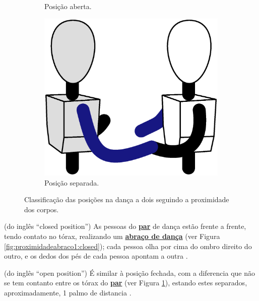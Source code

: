 \begin{figure}[!ht]
\begin{subfigure}[b]{0.31\textwidth}
         \caption{Posição aberta.}
         \label{fig:proximidadeabraco1:open}
     \end{subfigure}
     \hfill
     \begin{subfigure}[b]{0.31\textwidth}
         \centering
         \includegraphics[width=\textwidth]{chapters/cap-normas/position-apart.eps}
         \caption{Posição separada.}
         \label{fig:proximidadeabraco1:apart}
     \end{subfigure}
\caption{Classificação das posições na dança a dois seguindo a proximidade dos corpos.}
\label{fig:proximidadeabraco1}
\end{figure}


\begin{definition}
\label{def:closed-position}  (do inglês ``closed position'')
As pessoas do \hyperref[def:Par]{\textbf{par}} de dança estão frente a frente, tendo contato no tórax,
realizando um \hyperref[def:abracodedanca]{\textbf{abraço de dança}} (ver Figura \ref{fig:proximidadeabraco1:closed}); 
cada pessoa olha por cima do ombro direito do outro,
e os dedos dos pés de cada pessoa apontam a outra \cite{fletsher2015improve} \cite[pp. 6, 8]{harris1998social}.
\end{definition}


\begin{definition}
\label{def:open-position} (do inglês ``open position'') 
É similar à posição fechada, 
com a diferencia que não se tem contanto entre os tórax do \hyperref[def:Par]{\textbf{par}}
(ver Figura \ref{fig:proximidadeabraco1:open}),
estando estes separados, aproximadamente, 1 palmo de distancia \cite{fletsher2015improve} \cite[pp. 8]{harris1998social}.
\end{definition}



